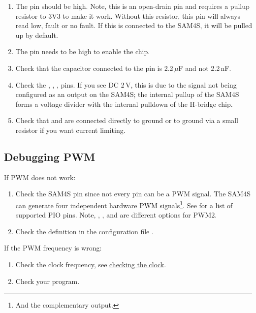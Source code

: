 \begin{enumerate}
\item The  pin should be high.  Note, this is an
  open-drain pin and requires a pullup resistor to 3V3 to make it
  work.  Without this resistor, this pin will always read low, fault
  or no fault.  If this is connected to the SAM4S, it will be pulled
  up by default.

\item The  pin needs to be high to enable the chip.

\item Check that the capacitor connected to the  pin is
  2.2\,$\mu$F and not 2.2\,nF.

\item Check the , , ,  pins.
  If you see DC 2\,V, this is due to the signal not being configured
  as an output on the SAM4S; the internal pullup of the SAM4S forms a
  voltage divider with the internal pulldown of the H-bridge chip.

\item Check that  and  are connected
  directly to ground or to ground via a small resistor if you want
  current limiting.
\end{enumerate}


\subsection{Debugging PWM}
\label{debugging-pwm}

If PWM does not work:

\begin{enumerate}
\item
  Check the SAM4S pin since not every pin can be a PWM signal.  The
  SAM4S can generate four independent hardware PWM
  signals\footnote{And the complementary output.}. See
   for a list of supported PIO pins.  Note,
  , , and  are different options for
  PWM2.

\item
  Check the definition in the configuration file .
\end{enumerate}

If the PWM frequency is wrong:

\begin{enumerate}
\item
  Check the clock frequency, see
  \hyperref[checking-the-clock]{checking the clock}.
\item
  Check your program.
\end{enumerate}

